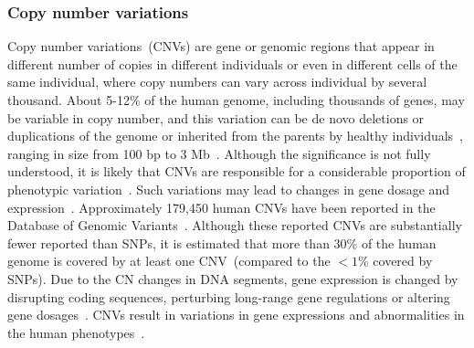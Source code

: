\subsubsection{Copy number variations}
\label{sec:cnv_data}
Copy number variations~(CNVs) are gene or genomic regions that appear in different number of copies in different individuals or even in different cells of the same individual, where copy numbers can vary across individual by several thousand. About 5-12\% of the human genome, including thousands of genes, may be variable in copy number, and this variation can be de novo deletions or duplications of the genome or inherited from the parents by healthy individuals~\cite{ostrovnaya2010classification}, ranging in size from 100 bp to 3 Mb~\cite{zhang2006development}. Although the significance is not fully understood, it is likely that CNVs are responsible for a considerable proportion of phenotypic variation~\cite{ostrovnaya2010classification}. Such variations may lead to changes in gene dosage and expression~\cite{diskin2009copy}. Approximately 179,450 human CNVs have been reported in the Database of Genomic Variants~\cite{iafrate2004detection,zhang2006development}. Although these reported CNVs are substantially fewer reported than SNPs, it is estimated that more than 30\% of the human genome is covered by at least one CNV~(compared to the $<1$\% covered by SNPs). Due to the CN changes in DNA segments, gene expression is changed by disrupting coding sequences, perturbing long-range gene regulations or altering gene dosages~\cite{37Yang}. CNVs result in variations in gene expressions and abnormalities in the human phenotypes~\cite{18Chen}. 

